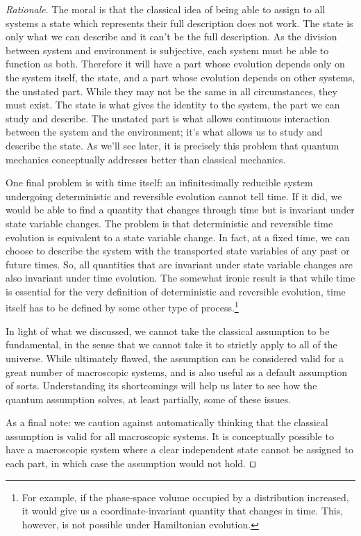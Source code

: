 \documentclass[smallextended]{svjour3}
\numberwithin{equation}{section}
\newenvironment{rationale}{\emph{Rationale}.}{\hfill\(\qed\)}
\theoremstyle{definition}
\newenvironment{rationale}{\emph{Rationale}.}{\qed}
\begin{document}
\begin{rationale}
	The moral is that the classical idea of being able to assign to all systems a state which represents their full description does not work. The state is only what we can describe and it can't be the full description. As the division between system and environment is subjective, each system must be able to function as both. Therefore it will have a part whose evolution depends only on the system itself, the state, and a part whose evolution depends on other systems, the unstated part. While they may not be the same in all circumstances, they must exist. The state is what gives the identity to the system, the part we can study and describe. The unstated part is what allows continuous interaction between the system and the environment; it's what allows us to study and describe the state. As we'll see later, it is precisely this problem that quantum mechanics conceptually addresses better than classical mechanics.
	
	One final problem is with time itself: an infinitesimally reducible system undergoing deterministic and reversible evolution cannot tell time. If it did, we would be able to find a quantity that changes through time but is invariant under state variable changes. The problem is that deterministic and reversible time evolution is equivalent to a state variable change. In fact, at a fixed time, we can choose to describe the system with the transported state variables of any past or future times. So, all quantities that are invariant under state variable changes are also invariant under time evolution. The somewhat ironic result is that while time is essential for the very definition of deterministic and reversible evolution, time itself has to be defined by some other type of process.\footnote{For example, if the phase-space volume occupied by a distribution increased, it would give us a coordinate-invariant quantity that changes in time. This, however, is not possible under Hamiltonian evolution.}
	
	In light of what we discussed, we cannot take the classical assumption to be fundamental, in the sense that we cannot take it to strictly apply to all of the universe. While ultimately flawed, the  assumption can be considered valid for a great number of macroscopic systems, and is also useful as a default assumption of sorts. Understanding its shortcomings will help us later to see how the quantum assumption solves, at least partially, some of these issues.
	
	As a final note: we caution against automatically thinking that the classical assumption is valid for all macroscopic systems. It is conceptually possible to have a macroscopic system where a clear independent state cannot be assigned to each part, in which case the assumption would not hold.
\end{rationale}
\end{document}
